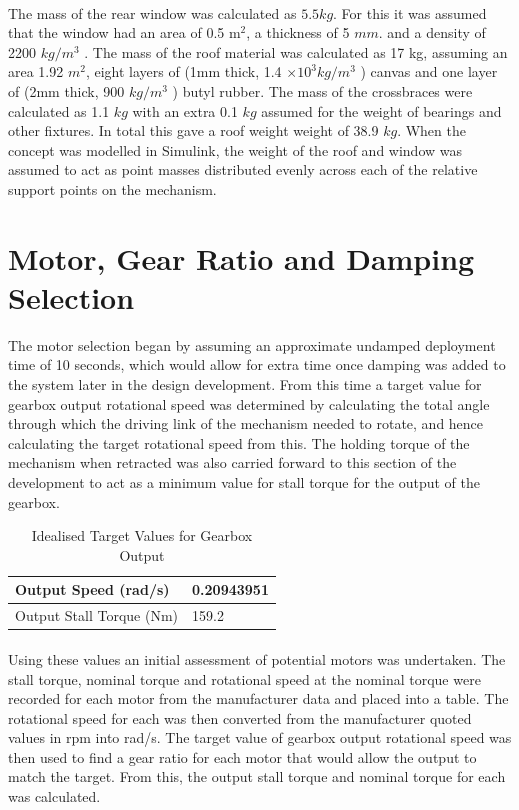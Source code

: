 \documentclass[a4paper]{article}
\begin{document}
\paragraph{}
The mass of the rear window was calculated as $5.5 kg$. For this it was assumed that the window had an area of 0.5 m$^2$, a thickness of 5 $mm$. and a density of 2200 $kg/m^3$ \cite{Encyclopaedia}. The mass of the roof material was calculated as 17 kg, assuming an area 1.92 $m^2$, eight layers of (1mm thick, 1.4 $\times 10^3 kg/m^3$ \cite{Canvas}) canvas and one layer of (2mm thick, 900 $kg/m^3$ \cite{CambMaterials}) butyl rubber. The mass of the crossbraces were calculated as 1.1 $kg$ with an extra  0.1 $kg$ assumed for the weight of bearings and other fixtures. In total this gave a roof weight weight of 38.9 $kg$. When the concept was modelled in Simulink, the weight of the roof and window was assumed to act as point masses distributed evenly across each of the relative support points on the mechanism.


\section{Motor, Gear Ratio and Damping Selection}
The motor selection began by assuming an approximate undamped deployment time of 10 seconds, which would allow for extra time once damping was added to the system later in the design development. From this time a target value for gearbox output rotational speed was determined by calculating the total angle through which the driving link of the mechanism needed to rotate, and hence calculating the target rotational speed from this. The holding torque of the mechanism when retracted was also carried forward to this section of the development to act as a minimum value for stall torque for the output of the gearbox.

\begin{table}[H]
\centering
\caption{Idealised Target Values for Gearbox Output}
\label{Target}
\begin{tabular}{||l|l||}
\hline
Output Speed (rad/s) & 0.20943951 \\ \hline
Output Stall Torque (Nm) & 159.2 \\ \hline\hline
\end{tabular}
\end{table}

\paragraph{}
Using these values an initial assessment of potential motors was undertaken. The stall torque, nominal torque and rotational speed at the nominal torque were recorded for each motor from the manufacturer data and placed into a table. The rotational speed for each was then converted from the manufacturer quoted values in rpm into rad/s. The target value of gearbox output rotational speed was then used to find a gear ratio for each motor that would allow the output to match the target. From this, the output stall torque and nominal torque for each was calculated.
\end{document}
